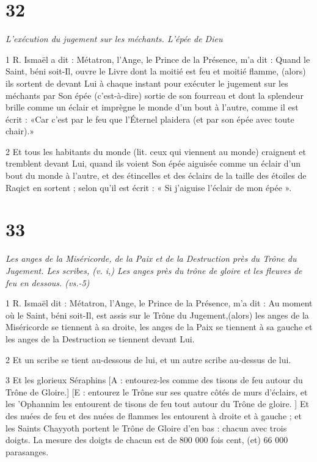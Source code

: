 \chapter{32}

\par \textit{L'exécution du jugement sur les méchants. L'épée de Dieu}

\par 1 R. Ismaël a dit : Métatron, l'Ange, le Prince de la Présence, m'a dit : Quand le Saint, béni soit-Il, ouvre le Livre dont la moitié est feu et moitié flamme, (alors) ils sortent de devant Lui à chaque instant pour exécuter le jugement sur les méchants par Son épée (c'est-à-dire) sortie de son fourreau et dont la splendeur brille comme un éclair et imprègne le monde d'un bout à l'autre, comme il est écrit : «Car c'est par le feu que l'Éternel plaidera (et par son épée avec toute chair).»

\par 2 Et tous les habitants du monde (lit. ceux qui viennent au monde) craignent et tremblent devant Lui, quand ils voient Son épée aiguisée comme un éclair d'un bout du monde à l'autre, et des étincelles et des éclairs de la taille des étoiles de Raqict en sortent ; selon qu'il est écrit : « Si j'aiguise l'éclair de mon épée ».


\chapter{33}

\par \textit{Les anges de la Miséricorde, de la Paix et de la Destruction près du Trône du Jugement. Les scribes, (v. i,) Les anges près du trône de gloire et les fleuves de feu en dessous. (vs.-5)}

\par 1 R. Ismaël dit : Métatron, l'Ange, le Prince de la Présence, m'a dit : Au moment où le Saint, béni soit-Il, est assis sur le Trône du Jugement,(alors) les anges de la Miséricorde se tiennent à sa droite, les anges de la Paix se tiennent à sa gauche et les anges de la Destruction se tiennent devant Lui.

\par 2 Et un scribe se tient au-dessous de lui, et un autre scribe au-dessus de lui.

\par 3 Et les glorieux Séraphins [A : entourez-les comme des tisons de feu autour du Trône de Gloire.] [E : entourez le Trône sur ses quatre côtés de murs d'éclairs, et les 'Ophannim les entourent de tisons de feu tout autour du Trône de gloire. ] Et des nuées de feu et des nuées de flammes les entourent à droite et à gauche ; et les Saints Chayyoth portent le Trône de Gloire d'en bas : chacun avec trois doigts. La mesure des doigts de chacun est de 800 000 fois cent, (et) 66 000 parasanges.

